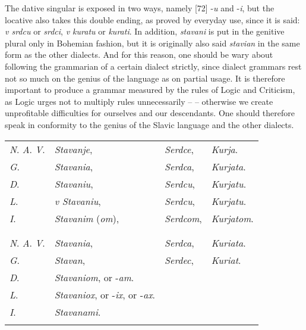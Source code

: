The dative singular is exposed in two ways, namely [72] -\textit{u} and -\textit{i}, but the locative also takes this double ending, as proved by everyday use, since it is said: \textit{v srdcu} or \textit{srdci}, \textit{v kuratu} or \textit{kurati}. In addition, \textit{stavani} is put in the genitive plural only in Bohemian fashion, but it is originally also said \textit{stavian} in the same form as the other dialects. And for this reason, one should be wary about following the grammarian of a certain dialect strictly, since dialect grammars rest not so much on the genius of the language as on partial usage. It is therefore important to produce a grammar measured by the rules of Logic and Criticism, as Logic urges not to multiply rules unnecessarily -- -- otherwise we create unprofitable difficulties for ourselves and our descendants. One should therefore speak in conformity to the genius of the Slavic language and the other dialects.

\begin{longtable}{ l l l l }
    \lsptoprule
    \multicolumn{4}{ c }{Singular.} \\
    \midrule
    \textit{N}. \textit{A}. \textit{V}. & \textit{Stavanje}, & \textit{Serdce}, & \textit{Kurja}. \\
    \textit{G}. & \textit{Stavania}, & \textit{Serdca}, & \textit{Kurjata}. \\
    \textit{D}. & \textit{Stavaniu}, & \textit{Serdcu}, & \textit{Kurjatu}. \\ 
    \textit{L}. & \textit{v Stavaniu}, & \textit{Serdcu}, & \textit{Kurjatu}. \\
    \textit{I}. & \textit{Stavanim} (\textit{om}), & \textit{Serdcom}, & \textit{Kurjatom}. \\
    \lspbottomrule
    \\
    \lsptoprule
    \multicolumn{4}{ c }{Plural.} \\
    \midrule
    \textit{N}. \textit{A}. \textit{V}. & \textit{Stavania}, & \textit{Serdca}, & \textit{Kuriata}. \\
    \textit{G}. & \textit{Stavan}, & \textit{Serdec}, & \textit{Kuriat}. \\
    \textit{D}. & \textit{Stavaniom}, or -\textit{am}. \\
    \textit{L}. & \textit{Stavaniox}, or -\textit{ix}, or -\textit{ax}. \\
    \textit{I}. & \textit{Stavanami}. \\
    \lspbottomrule
\end{longtable}

